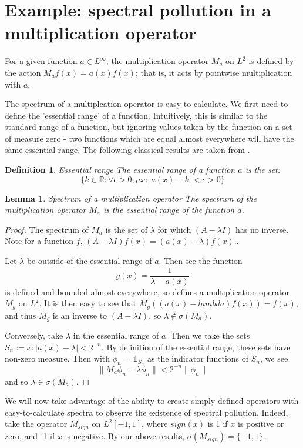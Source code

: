 \documentclass{article}
\newtheorem*{definition}{Definition}
\newtheorem{lemma}{Lemma}
\begin{document}
\section{Example: spectral pollution in a multiplication operator}

For a given function $a \in L^\infty$, the multiplication operator $M_a$ on $L^2$ is defined by
the action $M_af(x) = a(x)f(x)$; that is, it acts by pointwise multiplication with $a$.

The spectrum of a multiplcation operator is easy to calculate. We first
need to define the 'essential range' of a function. Intuitively, this is
similar to the standard range of a function, but ignoring values taken by
the function on a set of measure zero - two functions which are equal
almost everywhere will have the same essential range.
The following classical results are taken from \citet{davies1995spectral}.

\begin{definition}{Essential range}
  The essential range of a function $a$ is the set:
  $$\{k \in \mathbb{R} : \forall \epsilon > 0, \mu{x : |a(x) - k| < \epsilon} > 0\}$$
\end{definition}

\begin{lemma}{Spectrum of a multiplication operator}
  The spectrum of the multiplication operator $M_a$ is the essential range of the function $a$.
\end{lemma}
\begin{proof}
  The spectrum of $M_a$ is the set of $\lambda$ for which $(A - \lambda I)$ has no inverse. Note
  for a function $f$, $(A - \lambda I)f(x) = (a(x) - \lambda)f(x).$.

  Let $\lambda$ be outside of the essential range of $a$. Then see the function
  $$g(x) = \frac{1}{\lambda - a(x)}$$
  is defined and bounded almost everywhere, so defines a multiplication operator $M_g$ on $L^2$.
  It is then easy to see that $M_g((a(x) - lambda)f(x)) = f(x)$, and thus
  $M_g$ is an inverse to $(A - \lambda I)$, so $\lambda \notin \sigma(M_a)$.

  Conversely, take $\lambda$ in the essential range of $a$. Then we take the sets
  $S_n := {x: |a(x) - \lambda| < 2^{-n}}$. By definition of the essential range,
  these sets have non-zero measure. Then with $\phi_n$ = $\mathbb{1}_{S_n}$ as the indicator
  functions of $S_n$, we see
  $$\|M_a\phi_n - \lambda \phi_n\| < 2^{-n}\|\phi_n\|$$
  and so $\lambda \in \sigma(M_a)$.
\end{proof}

We will now take advantage of the ability to create simply-defined operators with easy-to-calculate
spectra to observe the existence of spectral pollution.
Indeed, take the operator $M_{sign}$ on $L^2[-1, 1]$, where $sign(x)$ is 1 if
$x$ is positive or zero, and -1 if $x$ is negative. By our above results, $\sigma(M_{sign}) = \{-1, 1\}$.

\printbibliography
\end{document}
